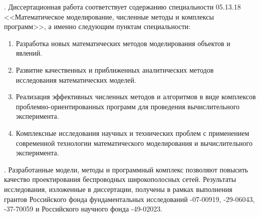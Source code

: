 \begin{enumerate}[beginpenalty=10000]
\end{enumerate}

{\fieldresearch}. Диссертационная работа соответствует содержанию специальности 05.13.18 <<Математическое моделирование, численные методы и комплексы программ>>, а именно следующим пунктам специальности:
\begin{enumerate}
    \item Разработка новых математических методов моделирования объектов и явлений.
    \item Развитие качественных и приближенных аналитических методов исследования математических моделей.
    \item Реализация эффективных численных методов и алгоритмов в виде комплексов проблемно-ориентированных программ для проведения вычислительного эксперимента.
    \item Комплексные исследования научных и технических проблем с применением современной технологии математического моделирования и вычислительного эксперимента.
\end{enumerate}

{\influence}. Разработанные модели, методы и программный комплекс позволяют повысить качество проектирования беспроводных широкополосных сетей. Результаты исследования, изложенные в диссертации, получены в рамках выполнения грантов Российского фонда фундаментальных исследований -07-00919,  -29-06043, -37-70059 и Российского научного фонда -49-02023. 


